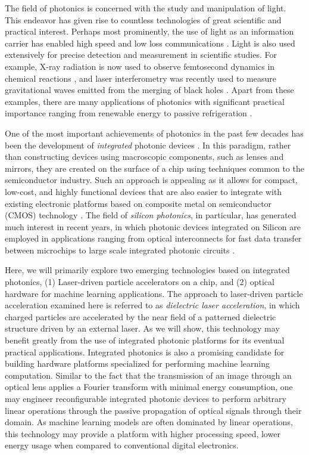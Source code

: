 
The field of photonics is concerned with the study and manipulation of light.
This endeavor has given rise to countless technologies of great scientific and practical interest.
Perhaps most prominently, the use of light as an information carrier has enabled high speed and low loss communications \cite{agrawal_fiber-optic_2012}.
Light is also used extensively for precise detection and measurement in scientific studies.  
For example, X-ray radiation is now used to observe femtosecond dynamics in chemical reactions \cite{kern_structures_2018}, and laser interferometry was recently used to measure gravitational waves emitted from the merging of black holes \cite{ligo_scientific_collaboration_and_virgo_collaboration_observation_2016}.
Apart from these examples, there are many applications of photonics with significant practical importance ranging from renewable energy \cite{carlson_amorphous_1976,yu_fundamental_2010} to passive refrigeration \cite{raman_passive_2014,hsu_radiative_2016}.

One of the most important achievements of photonics in the past few decades has been the development of \textit{integrated} photonic devices \cite{pollock_integrated_2010}.
In this paradigm, rather than constructing devices using macroscopic components, such as lenses and mirrors, they are created on the surface of a chip using techniques common to the semiconductor industry.
Such an approach is appealing as it allows for compact, low-cost, and highly functional devices that are also easier to integrate with existing electronic platforms based on composite metal on semiconductor (CMOS) technology \cite{weste_principles_1985}.
The field of \textit{silicon photonics}, in particular, has generated much interest in recent years, in which photonic devices integrated on Silicon are employed in applications ranging from optical interconnects for fast data transfer between microchips to large scale integrated photonic circuits \cite{jalali_silicon_2006}.

Here, we will primarily explore two emerging technologies based on integrated photonics, (1) Laser-driven particle accelerators on a chip, and (2) optical hardware for machine learning applications.
The approach to laser-driven particle acceleration examined here is referred to as \textit{dielectric laser acceleration}, in which charged particles are accelerated by the near field of a patterned dielectric structure driven by an external laser.
As we will show, this technology may benefit greatly from the use of integrated photonic platforms for its eventual practical applications.
Integrated photonics is also a promising candidate for building hardware platforms specialized for performing machine learning computation.
Similar to the fact that the transmission of an image through an optical lens applies a Fourier transform with minimal energy consumption, one may engineer reconfigurable integrated photonic devices to perform arbitrary linear operations through the passive propagation of optical signals through their domain.
As machine learning models are often dominated by linear operations, this technology may provide a platform with higher processing speed, lower energy usage when compared to conventional digital electronics.

